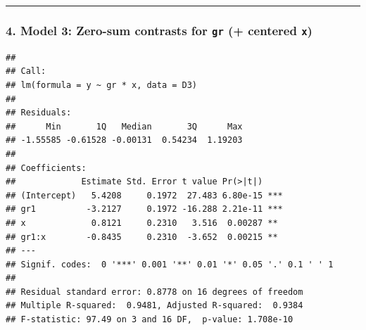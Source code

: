 \documentclass[
]{article}
\newenvironment{Shaded}{\begin{snugshade}}{\end{snugshade}}
\newcommand{\AttributeTok}[1]{\textcolor[rgb]{0.13,0.29,0.53}{#1}}
\newcommand{\DecValTok}[1]{\textcolor[rgb]{0.00,0.00,0.81}{#1}}
\newcommand{\FunctionTok}[1]{\textcolor[rgb]{0.13,0.29,0.53}{\textbf{#1}}}
\newcommand{\NormalTok}[1]{#1}
\newcommand{\OtherTok}[1]{\textcolor[rgb]{0.56,0.35,0.01}{#1}}
\newcommand{\SpecialCharTok}[1]{\textcolor[rgb]{0.81,0.36,0.00}{\textbf{#1}}}
\begin{document}
\begin{center}\rule{0.5\linewidth}{0.5pt}\end{center}

\subsubsection{\texorpdfstring{4. Model 3: Zero-sum contrasts for
\texttt{gr} (+ centered
\texttt{x})}{4. Model 3: Zero-sum contrasts for gr (+ centered x)}}\label{model-3-zero-sum-contrasts-for-gr-centered-x}

\begin{Shaded}
\end{Shaded}

\begin{verbatim}
## 
## Call:
## lm(formula = y ~ gr * x, data = D3)
## 
## Residuals:
##      Min       1Q   Median       3Q      Max 
## -1.55585 -0.61528 -0.00131  0.54234  1.19203 
## 
## Coefficients:
##             Estimate Std. Error t value Pr(>|t|)    
## (Intercept)   5.4208     0.1972  27.483 6.80e-15 ***
## gr1          -3.2127     0.1972 -16.288 2.21e-11 ***
## x             0.8121     0.2310   3.516  0.00287 ** 
## gr1:x        -0.8435     0.2310  -3.652  0.00215 ** 
## ---
## Signif. codes:  0 '***' 0.001 '**' 0.01 '*' 0.05 '.' 0.1 ' ' 1
## 
## Residual standard error: 0.8778 on 16 degrees of freedom
## Multiple R-squared:  0.9481, Adjusted R-squared:  0.9384 
## F-statistic: 97.49 on 3 and 16 DF,  p-value: 1.708e-10
\end{verbatim}
\end{document}
